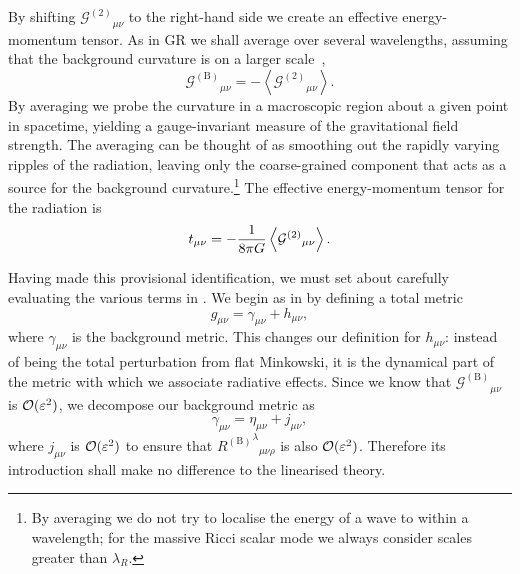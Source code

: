 By shifting ${\mathcal{G}^{(2)}}_{\mu\nu}$ to the right-hand side we create an effective energy-momentum tensor. As in GR we shall average over several wavelengths, assuming that the background curvature is on a larger scale~\cite{Misner1973, Stein2011},
\begin{equation}
{\mathcal{G}^{(\text{B})}}_{\mu\nu} = -\left\langle{\mathcal{G}^{(2)}}_{\mu\nu}\right\rangle.
\end{equation}
By averaging we probe the curvature in a macroscopic region about a given point in spacetime, yielding a gauge-invariant measure of the gravitational field strength. The averaging can be thought of as smoothing out the rapidly varying ripples of the radiation, leaving only the coarse-grained component that acts as a source for the background curvature.\footnote{By averaging we do not try to localise the energy of a wave to within a wavelength; for the massive Ricci scalar mode we always consider scales greater than $\lambda_R$.} The effective energy-momentum tensor for the radiation is
\begin{equation}
t_{\mu\nu} = -\frac{1}{8\pi G}\left\langle{\mathcal{G}^{(\text{2})}}_{\mu\nu}\right\rangle.
\end{equation}

Having made this provisional identification, we must set about carefully evaluating the various terms in . We begin as in  by defining a total metric
\begin{equation}
g_{\mu\nu} = \gamma_{\mu\nu} + h_{\mu\nu},
\end{equation}
where $\gamma_{\mu\nu}$ is the background metric. This changes our definition for $h_{\mu\nu}$: instead of being the total perturbation from flat Minkowski, it is the dynamical part of the metric with which we associate radiative effects. Since we know that ${\mathcal{G}^{(\text{B})}}_{\mu\nu}$ is $\mathcal{O}({\varepsilon^2})$, we decompose our background metric as
\begin{equation}
\gamma_{\mu\nu} = \eta_{\mu\nu} + j_{\mu\nu},
\end{equation}
where $j_{\mu\nu}$ is $\mathcal{O}({\varepsilon^2})$ to ensure that ${{R^{(\text{B})}}^\lambda}_{\mu\nu\rho}$ is also $\mathcal{O}({\varepsilon^2})$. Therefore its introduction shall make no difference to the linearised theory.

